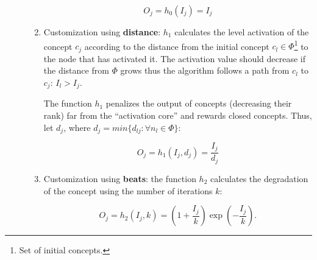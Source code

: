 \begin{description}
\begin{enumerate}
\begin{equation}
O_j = h_0(I_j) = I_j
\end{equation}


\item Customization using {\bf distance}: $h_1$ calculates the level activation
of the concept $c_j$  according to the distance from the initial concept $c_l
\in \Phi$\footnote{Set of initial concepts.} to the node that has activated it. The
activation value should decrease if the distance from $\Phi$ grows thus
the algorithm follows a path from $c_l$ to $c_j$: $I_l > I_j$.


The function $h_1$ penalizes the output of concepts (decreasing their rank)
far from the ``activation core'' and rewards closed concepts. Thus, let $d_j$,
where $d_j = min\{d_{lj}:\forall n_l \in \Phi\}$:


\begin{equation}
 O_j = h_1(I_j,d_j)= \frac{I_j} {d_j}
\end{equation}

\item Customization using {\bf beats}: the function $h_2$ calculates the
degradation of the concept using the number of iterations $k$:

\begin{equation}
 O_j = h_2(I_j,k) = (1+\frac{I_j}{k})\exp(-\frac{I_j}{k}).
\end{equation}

\end{enumerate}

\end{description}

